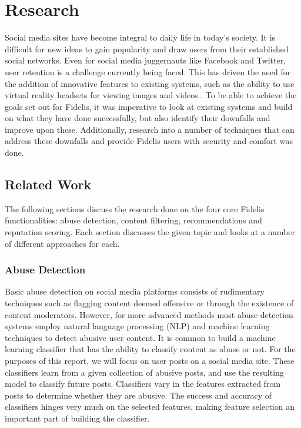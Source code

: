\chapter{Research}
\label{Chapter:Research}
Social media sites have become integral to daily life in today's society. It is difficult for new ideas to gain popularity and draw users from their established social networks. Even for social media juggernauts like Facebook and Twitter, user retention is a challenge currently being faced. This has driven the need for the addition of innovative features to existing systems, such as the ability to use virtual reality headsets for viewing images and videos \cite{Facebook:VR}. To be able to achieve the goals set out for Fidelis, it was imperative to look at existing systems and build on what they have done successfully, but also identify their downfalls and improve upon these. Additionally, research into a number of techniques that can address these downfalls and provide Fidelis users with security and comfort was done.

\section{Related Work}
The following sections discuss the research done on the four core Fidelis functionalities: abuse detection, content filtering, recommendations and reputation scoring. Each section discusses the given topic and looks at a number of different approaches for each.

\subsection{Abuse Detection}
Basic abuse detection on social media platforms consists of rudimentary techniques such as flagging content deemed offensive or through the existence of content moderators. However, for more advanced methods most abuse detection systems employ natural language processing (NLP) and machine learning techniques to detect abusive user content. It is common to build a machine learning classifier that has the ability to classify content as abuse or not. For the purposes of this report, we will focus on user posts on a social media site. These classifiers learn from a given collection of abusive posts, and use the resulting model to classify future posts. Classifiers vary in the features extracted from posts to determine whether they are abusive. The success and accuracy of classifiers hinges very much on the selected features, making feature selection an important part of building the classifier.

